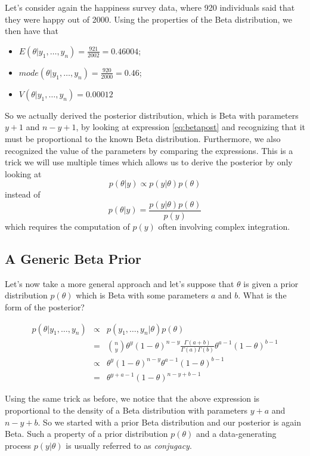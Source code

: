 \documentclass[
]{book}
\begin{document}
Let's consider again the happiness survey data, where 920 individuals said that they were happy out of 2000. Using the properties of the Beta distribution, we then have that

\begin{itemize}
\item
  \(E(\theta|y_1,\dots,y_n)= \frac{921}{2002}=0.46004\);
\item
  \(mode(\theta|y_1,\dots,y_n)=\frac{920}{2000}=0.46\);
\item
  \(V(\theta|y_1,\dots,y_n)= 0.00012\)
\end{itemize}

So we actually derived the posterior distribution, which is Beta with parameters \(y+1\) and \(n-y+1\), by looking at expression \eqref{eq:betapost} and recognizing that it must be proportional to the known Beta distribution. Furthermore, we also recognized the value of the parameters by comparing the expressions. This is a trick we will use multiple times which allows us to derive the posterior by only looking at
\[
p(\theta|y)\propto p(y|\theta)p(\theta)
\]
instead of
\[
p(\theta|y) =  \frac{p(y|\theta)p(\theta)}{p(y)}
\]
which requires the computation of \(p(y)\) often involving complex integration.

\hypertarget{a-generic-beta-prior}{%
\subsection{A Generic Beta Prior}\label{a-generic-beta-prior}}

Let's now take a more general approach and let's suppose that \(\theta\) is given a prior distribution \(p(\theta)\) which is Beta with some parameters \(a\) and \(b\). What is the form of the posterior?

\begin{eqnarray*}
p(\theta|y_1,\dots,y_n)&\propto& p(y_1,\dots,y_n|\theta)p(\theta)\\
 &= & \binom{n}{y}\theta^y(1-\theta)^{n-y}\frac{\Gamma(a+b)}{\Gamma(a)\Gamma(b)}\theta^{a-1}(1-\theta)^{b-1}\\
 &\propto& \theta^y(1-\theta)^{n-y}\theta^{a-1}(1-\theta)^{b-1}\\
 & = & \theta^{y+a-1}(1-\theta)^{n-y + b -1}
\end{eqnarray*}

Using the same trick as before, we notice that the above expression is proportional to the density of a Beta distribution with parameters \(y+a\) and \(n-y+b\). So we started with a prior Beta distribution and our posterior is again Beta. Such a property of a prior distribution \(p(\theta)\) and a data-generating process \(p(y|\theta)\) is usually referred to as \emph{conjugacy}.
\end{document}
